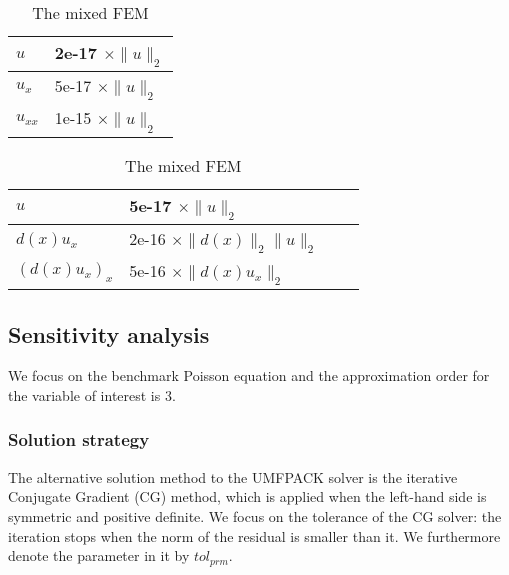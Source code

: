\documentclass[review,3p]{elsarticle}
\begin{document}
\begin{table}[!ht]
\hspace{2.5cm}
\begin{subtable}{0.4\textwidth}
\caption{The standard FEM}
\begin{tabular}{l l}
\hline
$u$ & 2e-17 $\times \|u\|_2$ \\ \hline 
$u_x$ & 5e-17 $\times \|u\|_2$ \\ \hline
$u_{xx}$ & 1e-15 $\times \|u\|_2$ \\ \hline
\end{tabular}
\end{subtable}
\hspace{-0.5cm}
\begin{subtable}{.4\textwidth}
\caption{The mixed FEM}
\begin{tabular}{l l l l}
\hline
$u$ & 5e-17 $\times \|u\|_2$ \\ \hline 
$d(x)u_x$ & 2e-16 $\times \|d(x)\|_2 \|u\|_2$ \\ \hline
$(d(x)u_x)_x$ & 5e-16 $\times \|d(x)u_x\|_2$ \\ \hline
\end{tabular}
\end{subtable}
\label{relation_alpha_R_l2_norm_u_du}
\end{table}


\newpage
\subsection{Sensitivity analysis}       \label{section_sensitivity}

We focus on the benchmark Poisson equation and the approximation order for the variable of interest is 3.

\subsubsection{Solution strategy}		\label{section_solver}

The alternative solution method to the UMFPACK solver is the iterative Conjugate Gradient (CG) method\cite{ginsburg1963cg}, which is applied when the left-hand side is symmetric and positive definite. We focus on the tolerance of the CG solver: the iteration stops when the norm of the residual is smaller than it. We furthermore denote the parameter in it by $tol_{prm}$.
\end{document}
